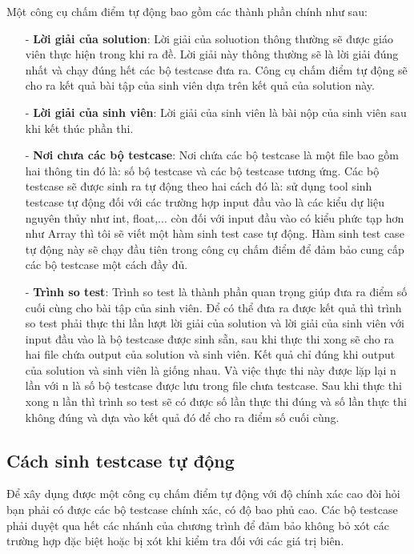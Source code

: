 \documentclass[12pt,a4paper]{article}
\begin{document}
Một công cụ chấm điểm tự động bao gồm các thành phần chính như sau:
\begin{itemize}
\item[-] \textbf{Lời giải của solution}: Lời giải của soluotion thông thường sẽ được giáo viên thực hiện trong khi ra đề. Lời giải này thông thường sẽ là lời giải đúng nhất và chạy đúng hết các bộ testcase đưa ra. Công cụ chấm điểm tự động sẽ cho ra kết quả bài tập của sinh viên dựa trên kết quả của solution này.
\item[-] \textbf{Lời giải của sinh viên}: Lời giải của sinh viên là bài nộp của sinh viên sau khi kết thúc phần thi.
\item[-] \textbf{Nơi chưa các bộ testcase}: Nơi chứa các bộ testcase là một file bao gồm hai thông tin đó là: số bộ testcase và các bộ testcase tương ứng. Các bộ testcase sẽ được sinh ra tự động theo hai cách đó là: sử dụng tool sinh testcase tự động đối với các trường hợp input đầu vào là các kiểu dự liệu nguyên thủy như int, float,... còn đối với input đầu vào có kiểu phức tạp hơn như Array thì tôi sẽ viết một hàm sinh test case tự động. Hàm sinh test case tự động này sẽ chạy đầu tiên trong công cụ chấm điểm để đảm bảo cung cấp các bộ testcase một cách đầy đủ.
\item[-] \textbf{Trình so test}: Trình so test là thành phần quan trọng giúp đưa ra điểm số cuối cùng cho bài tập của sinh viên. Để có thể đưa ra được kết quả thì trình so test phải thực thi lần lượt lời giải của solution và lời giải của sinh viên với input đầu vào là bộ testcase được sinh sẵn, sau khi thực thi xong sẽ cho ra hai file chứa output của solution và sinh viên. Kết quả chỉ đúng khi output của solution và sinh viên là giống nhau. Và việc thực thi này được lặp lại n lần với n là số bộ testcase được lưu trong file chưa testcase. Sau khi thực thi xong n lần thì trình so test sẽ có được số lần thực thi đúng và số lần thực thi không đúng và dựa vào kết quả đó để cho ra điểm số cuối cùng.
\end{itemize}

\subsection{Cách sinh testcase tự động}

Để xây dụng được một công cụ chấm điểm tự động với độ chính xác cao đòi hỏi bạn phải có được các bộ testcase chính xác, có độ bao phủ cao. Các bộ testcase phải duyệt qua hết các nhánh của chương trình để đảm bảo không bỏ xót các trường hợp đặc biệt hoặc bị xót khi kiểm tra đối với các giá trị biên.
\end{document}
